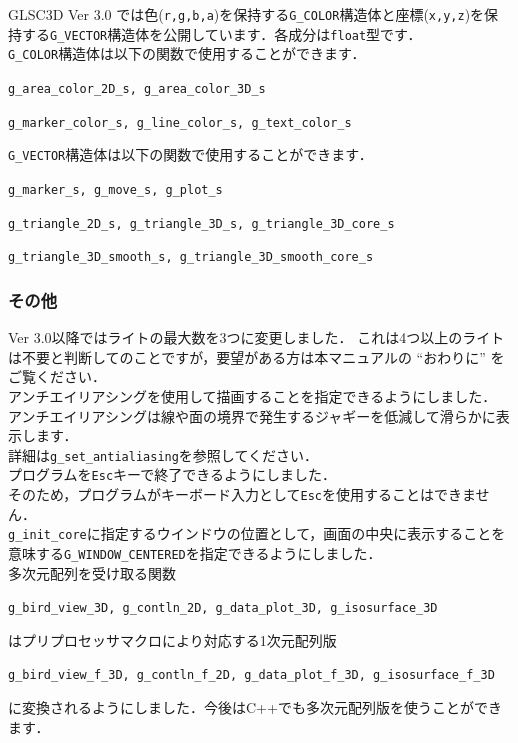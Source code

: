 \documentclass[platex,a4paper,12pt]{jsarticle}%
\begin{document}
GLSC3D Ver 3.0 では色(\verb|r,g,b,a|)を保持する\verb|G_COLOR|構造体と座標(\verb|x,y,z|)を保持する\verb|G_VECTOR|構造体を公開しています．各成分は\verb|float|型です．\\

\verb|G_COLOR|構造体は以下の関数で使用することができます．
\begin{description}
\item \verb|g_area_color_2D_s, g_area_color_3D_s|
\item \verb|g_marker_color_s, g_line_color_s, g_text_color_s|
\end{description}

\verb|G_VECTOR|構造体は以下の関数で使用することができます．
\begin{description}
\item \verb|g_marker_s, g_move_s, g_plot_s|
\item \verb|g_triangle_2D_s, g_triangle_3D_s, g_triangle_3D_core_s|
\item \verb|g_triangle_3D_smooth_s, g_triangle_3D_smooth_core_s|
\end{description}

\newpage
\subsubsection{その他}
Ver 3.0以降ではライトの最大数を3つに変更しました．
これは4つ以上のライトは不要と判断してのことですが，要望がある方は本マニュアルの ``おわりに'' をご覧ください．\\

アンチエイリアシングを使用して描画することを指定できるようにしました．\\
アンチエイリアシングは線や面の境界で発生するジャギーを低減して滑らかに表示します．\\
詳細は\verb|g_set_antialiasing|を参照してください．\\

プログラムを\verb|Esc|キーで終了できるようにしました．\\
そのため，プログラムがキーボード入力として\verb|Esc|を使用することはできません．\\

\verb|g_init_core|に指定するウインドウの位置として，画面の中央に表示することを意味する\verb|G_WINDOW_CENTERED|を指定できるようにしました．\\

多次元配列を受け取る関数
\begin{center}
	\verb|g_bird_view_3D, g_contln_2D, g_data_plot_3D, g_isosurface_3D|
\end{center}
はプリプロセッサマクロにより対応する1次元配列版
\begin{center}
	\verb|g_bird_view_f_3D, g_contln_f_2D, g_data_plot_f_3D, g_isosurface_f_3D|
\end{center}
に変換されるようにしました．今後はC++でも多次元配列版を使うことができます．
\end{document}
